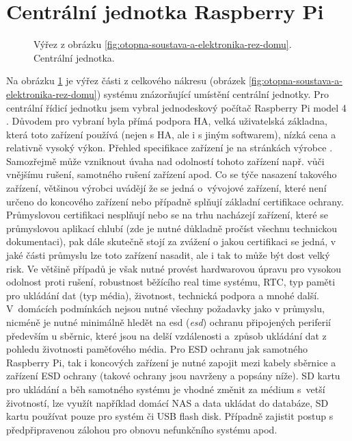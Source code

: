 \section{Centrální jednotka Raspberry Pi}


\begin{figure}[H]
    \centering
    \def\svgwidth{0.3\columnwidth}
    
    \caption[Centrální jednotka.]{Výřez z obrázku \ref{fig:otopna-soustava-a-elektronika-rez-domu}. Centrální jednotka.}
    \label{fig:vyrez-centralni-jednotka}
\end{figure}

Na obrázku \ref{fig:vyrez-centralni-jednotka} je výřez části z celkového nákresu (obrázek \ref{fig:otopna-soustava-a-elektronika-rez-domu}) systému znázorňující umístění centrální jednotky. Pro centrální řídicí jednotku jsem vybral jednodeskový počítač Raspberry Pi model 4 \cite{raspberry-pi}. Důvodem pro vybraní byla přímá podpora HA, velká uživatelská základna, která toto zařízení používá (nejen s HA, ale i s jiným softwarem), nízká cena a relativně vysoký výkon. Přehled specifikace zařízení je na stránkách výrobce \cite{raspberry-pi}. Samozřejmě může vzniknout úvaha nad odolností tohoto zařízení např. vůči vnějšímu rušení, samotného rušení zařízení apod. Co se týče nasazení takového zařízení, většinou výrobci uvádějí že se jedná o~vývojové zařízení, které není určeno do koncového zařízení nebo případně splňují  základní certifikace ochrany. Průmyslovou certifikaci nesplňují nebo se na trhu nacházejí zařízení, které se průmyslovou aplikací chlubí (zde je nutné důkladně pročíst všechnu technickou dokumentaci), pak dále skutečně stojí za zvážení o jakou certifikaci se jedná, v jaké části průmyslu lze toto zařízení nasadit, ale i tak to může být dost velký risk. Ve většině případů je však nutné provést hardwarovou úpravu pro vysokou odolnost proti rušení, robustnost běžícího real time systému, RTC, typ paměti pro ukládání dat (typ média), životnost, technická podpora a mnohé další. V~domácích podmínkách nejsou nutné všechny požadavky jako v průmyslu, nicméně je nutné minimálně hledět na \acrshort{esd} (\textit{\acrlong{esd}}) ochranu připojených periferií především u sběrnic, které jsou na delší vzdálenosti a~způsob ukládání dat z pohledu životnosti paměťového média. Pro ESD ochranu jak samotného Raspberry Pi, tak i koncových zařízení je nutné zapojit mezi kabely sběrnice a zařízení ESD ochrany (takové ochrany jsou navrženy a popsány níže). SD kartu pro ukládání a běh samotného systému je vhodné změnit za médium s~vetší životností, lze využít například domácí NAS a data ukládat do databáze, SD kartu používat pouze pro systém či USB flash disk. Případně zajistit postup s předpřipravenou zálohou pro obnovu nefunkčního systému apod. 